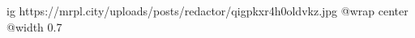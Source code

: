  
 
 
 
 

\ifcmt
  ig https://mrpl.city/uploads/posts/redactor/qigpkxr4h0oldvkz.jpg
  @wrap center
  @width 0.7
\fi
